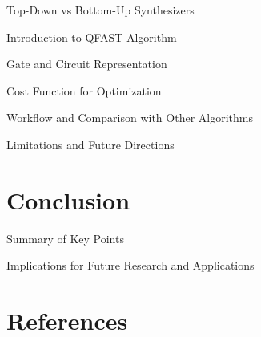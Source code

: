 \documentclass[aspectratio=1610]{beamer}
\begin{document}
\begin{frame}{Top-Down vs Bottom-Up Synthesizers}
\end{frame}

\begin{frame}{Introduction to QFAST Algorithm}
\end{frame}

\begin{frame}{Gate and Circuit Representation}
\end{frame}

\begin{frame}{Cost Function for Optimization}
\end{frame}

\begin{frame}{Workflow and Comparison with Other Algorithms}
\end{frame}

\begin{frame}{Limitations and Future Directions}
\end{frame}

\section{Conclusion}

\begin{frame}{Summary of Key Points}
\end{frame}

\begin{frame}{Implications for Future Research and Applications}
\end{frame}

\section{References}

\begin{frame}{}
\end{frame}
\end{document}
